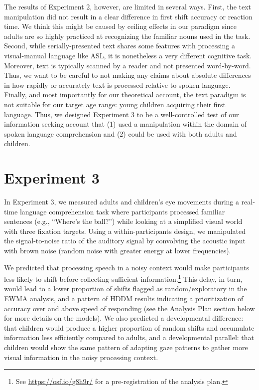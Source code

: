 \documentclass[english,floatsintext,man]{apa6}
\begin{document}
The results of Experiment 2, however, are limited in several ways.
First, the text manipulation did not result in a clear difference in
first shift accuracy or reaction time. We think this might be caused by
ceiling effects in our paradigm since adults are so highly practiced at
recognizing the familiar nouns used in the task. Second, while
serially-presented text shares some features with processing a
visual-manual language like ASL, it is nonetheless a very different
cognitive task. Moreover, text is typically scanned by a reader and not
presented word-by-word. Thus, we want to be careful to not making any
claims about absolute differences in how rapidly or accurately text is
processed relative to spoken language. Finally, and most importantly for
our theoretical account, the text paradigm is not suitable for our
target age range: young children acquiring their first language. Thus,
we designed Experiment 3 to be a well-controlled test of our information
seeking account that (1) used a manipulation within the domain of spoken
language comprehension and (2) could be used with both adults and
children.

\hypertarget{experiment-3}{%
\section{Experiment 3}\label{experiment-3}}

In Experiment 3, we measured adults and children's eye movements during
a real-time language comprehension task where participants processed
familiar sentences (e.g., \enquote{Where's the ball?}) while looking at
a simplified visual world with three fixation targets. Using a
within-participants design, we manipulated the signal-to-noise ratio of
the auditory signal by convolving the acoustic input with brown noise
(random noise with greater energy at lower frequencies).

We predicted that processing speech in a noisy context would make
participants less likely to shift before collecting sufficient
information.\footnote{See \url{https://osf.io/g8h9r/} for a
  pre-registration of the analysis plan.} This delay, in turn, would
lead to a lower proportion of shifts flagged as random/exploratory in
the EWMA analysis, and a pattern of HDDM results indicating a
prioritization of accuracy over and above speed of responding (see the
Analysis Plan section below for more details on the models). We also
predicted a developmental difference: that children would produce a
higher proportion of random shifts and accumulate information less
efficiently compared to adults, and a developmental parallel: that
children would show the same pattern of adapting gaze patterns to gather
more visual information in the noisy processing context.
\end{document}
